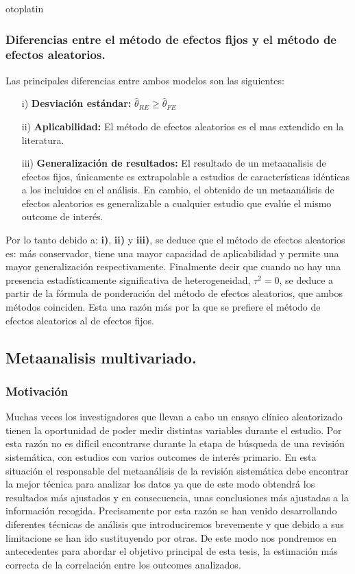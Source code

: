 otoplatin\documentclass[a4paper,openright,12pt]{report}
\begin{document}
\subsubsection{Diferencias entre el método de efectos fijos y el método de efectos aleatorios.}
Las principales diferencias entre ambos modelos son las siguientes:
\begin{itemize}
\item[i)] \textbf{Desviación estándar:} $\widehat{\theta}_{RE}\geq\widehat{\theta}_{FE}$
\item[ii)] \textbf{Aplicabilidad:} El método de efectos aleatorios es el mas extendido en la literatura.
\item[iii)] \textbf{Generalización de resultados:} El resultado de un metaanalisis de efectos fijos, únicamente es extrapolable a estudios de características idénticas a los incluidos en el análisis. En cambio, el obtenido de un metaanálisis de efectos aleatorios es generalizable a cualquier estudio que evalúe el mismo outcome de interés.
\end{itemize}
Por lo tanto debido a: \textbf{i)}, \textbf{ii)} y \textbf{iii)}, se deduce que el método de efectos aleatorios es: más conservador, tiene una mayor capacidad de aplicabilidad y permite una mayor generalización respectivamente. Finalmente decir que cuando no hay una presencia estadísticamente significativa de heterogeneidad, $\tau^{2}=0$, se deduce a partir de la fórmula de ponderación del método de efectos aleatorios, que ambos métodos coinciden. Esta una razón más por la que se prefiere el método de efectos aleatorios al de efectos fijos. 
\newpage
\subsection{Metaanalisis multivariado.}
\subsubsection{Motivación}
Muchas veces los investigadores que llevan a cabo un ensayo clínico aleatorizado tienen la oportunidad de poder medir distintas variables durante el estudio. Por esta razón no es difícil encontrarse durante la etapa de búsqueda de una revisión sistemática, con estudios con varios outcomes de interés primario. En esta situación el responsable del metaanálisis de la revisión sistemática debe encontrar la mejor técnica para analizar los datos ya que de este modo obtendrá los resultados más ajustados y en consecuencia, unas conclusiones más ajustadas a la información recogida.
Precisamente por esta razón se han venido desarrollando diferentes técnicas de análisis que introduciremos brevemente y que debido a sus limitacione se han ido sustituyendo por otras. De este modo nos pondremos en antecedentes para abordar el objetivo principal de esta tesis, la estimación más correcta de la correlación entre los outcomes analizados.
\end{document}
